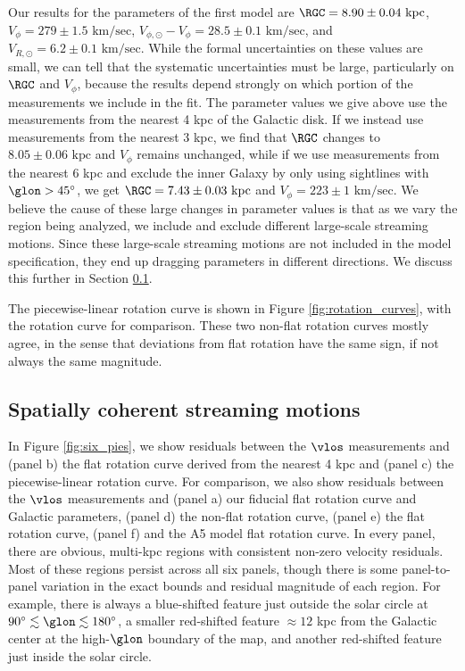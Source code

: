 Our results for the parameters of the first model are $\RGC=8.90 \pm 0.04 \text{ kpc}$, $V_\phi = 279 \pm 1.5 \text{ km/sec}$, $V_{\phi, \odot} - V_\phi = 28.5 \pm 0.1 \text{ km/sec}$, and $V_{R, \odot} = 6.2 \pm 0.1 \text{ km/sec}$.
While the formal uncertainties on these values are small, we can tell that the systematic uncertainties must be large, particularly on $\RGC$ and $V_\phi$, because the results depend strongly on which portion of the measurements we include in the fit.
The parameter values we give above use the measurements from the nearest 4 kpc of the Galactic disk.
If we instead use measurements from the nearest 3 kpc, we find that $\RGC$ changes to $8.05 \pm 0.06 \text{ kpc}$ and $V_\phi$ remains unchanged, while if we use measurements from the nearest 6 kpc and exclude the inner Galaxy by only using sightlines with $\glon > 45^\circ$, we get $\RGC = 7.43 \pm 0.03 \text{ kpc}$ and $V_\phi = 223 \pm 1 \text{ km/sec}$.
We believe the cause of these large changes in parameter values is that as we vary the region being analyzed, we include and exclude different large-scale streaming motions. 
Since these large-scale streaming motions are not included in the model specification, they end up dragging parameters in different directions.
We discuss this further in Section \ref{sec:rotation_discussion}.

The piecewise-linear rotation curve is shown in Figure \ref{fig:rotation_curves}, with the \Clemens rotation curve for comparison. 
These two non-flat rotation curves mostly agree, in the sense that deviations from flat rotation have the same sign, if not always the same magnitude.

\subsection{Spatially coherent streaming motions}
\label{sec:rotation_discussion}
In Figure \ref{fig:six_pies}, we show residuals between the $\vlos$ measurements and (panel b) the flat rotation curve derived from the nearest 4 kpc and (panel c) the piecewise-linear rotation curve. 
For comparison, we also show residuals between the $\vlos$ measurements and (panel a) our fiducial flat rotation curve and Galactic parameters, (panel d) the \Clemens non-flat rotation curve, (panel e) the \cite{2012ApJ...759..131B} flat rotation curve, (panel f) and the \Reid A5 model flat rotation curve.
In every panel, there are obvious, multi-kpc regions with consistent non-zero velocity residuals.
Most of these regions persist across all six panels, though there is some panel-to-panel variation in the exact bounds and residual magnitude of each region. 
For example, there is always a blue-shifted feature just outside the solar circle at $90^\circ \lesssim \glon \lesssim 180^\circ$, a smaller red-shifted feature $\approx 12$ kpc from the Galactic center at the high-$\glon$ boundary of the map, and another red-shifted feature just inside the solar circle. 


